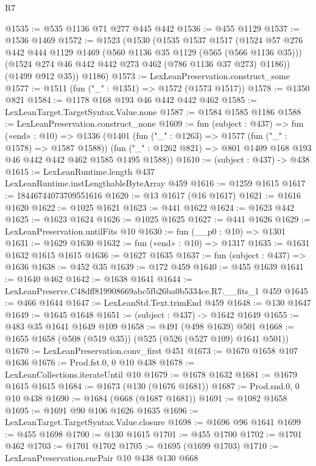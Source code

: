 \begin{lexlean}{R7}
\begin{coremodule}
@1535 := @535 @1136 @71 @277 @445 @442
@1536 := @455 @1129
@1537 := @1536 @1469
@1572 := @1523
    (@1530
      (@1535
        @1537
        @1517
        (@1524
          @57
          @276
          @442
          @444
          @1129
          @1469
          (@560 @1136 @35 @1129 (@565 (@566 @1136 @35)))
          (@1524 @274 @46 @442 @442 @273 @462 (@786 @1136 @37 @273) @1186))
        (@1499 @912 @35))
      @1186)
@1573 := LexLeanPreservation.construct_some
@1577 := @1511 (fun ("_" : @1351) => @1572 (@1573 @1517))
@1578 := @1350 @821
@1584 := @1178 @168 @193 @46 @442 @442 @462
@1585 := LexLeanTarget.TargetSyntax.Value.none
@1587 := @1584 @1585 @1186
@1588 := LexLeanPreservation.construct_none
@1609 := fun (subject : @437) =>
  fun («end» : @10) =>
  @1336
    (@1401
      (fun ("_" : @1263) => @1577 (fun ("_" : @1578) => @1587 @1588))
      (fun ("_" : @1262 @821) => @801 @1409 @168 @193 @46 @442 @442 @462 @1585 @1495 @1588))
@1610 := (subject : @437) -> @438
@1615 := LexLeanRuntime.length @437 LexLeanRuntime.instLengthableByteArray @459
@1616 := @1259 @1615
@1617 := 18446744073709551616
@1620 := @13 @1617 (@16 @1617)
@1621 := @1616 @1620
@1622 := @1025 @1621
@1623 := @441 @1622
@1624 := @1623 @442
@1625 := @1623 @1624
@1626 := @1025 @1625
@1627 := @441 @1626
@1629 := LexLeanPreservation.untilFits @10
@1630 := fun (__p0 : @10) => @1301
@1631 := @1629 @1630
@1632 := fun («end» : @10) => @1317
@1635 := @1631 @1632 @1615 @1615
@1636 := @1627 @1635
@1637 := fun (subject : @437) => @1636
@1638 := @452 @35
@1639 := @172 @459
@1640 := @455 @1639
@1641 := @1640 @462
@1642 := @1638 @1641
@1644 := LexLeanPreserve.C48dff819908669abc5fb26ba0b5334ce.R7.__fits_1 @459
@1645 := @466 @1644
@1647 := LexLeanStd.Text.trimEnd @459
@1648 := @130 @1647
@1649 := @1645 @1648
@1651 := (subject : @437) -> @1642 @1649
@1655 := @483 @35 @1641 @1649 @109
@1658 := @491 (@498 @1639) @501
@1668 := @1655 @1658 (@508 (@519 @35)) (@525 (@526 (@527 @109) @1641 @501))
@1670 := LexLeanPreservation.conv_first @451
@1673 := @1670 @1658 @107 @1636
@1676 := Prod.fst.{0, 0} @10 @438
@1678 := LexLeanCollections.iterateUntil @10
@1679 := @1678 @1632
@1681 := @1679 @1615 @1615
@1684 := @1673 (@130 (@1676 @1681))
@1687 := Prod.snd.{0, 0} @10 @438
@1690 := @1684 (@668 (@1687 @1681))
@1691 := @1082 @1658
@1695 := @1691 @90 @106 @1626 @1635
@1696 := LexLeanTarget.TargetSyntax.Value.closure
@1698 := @1696 @96 @1641
@1699 := @455 @1698
@1700 := @130 @1615
@1701 := @455 @1700
@1702 := @1701 @462
@1703 := @1701 @1702
@1705 := @1695 (@1699 @1703)
@1710 := LexLeanPreservation.encPair @10 @438 @130 @668

\end{coremodule}
\end{lexlean}
